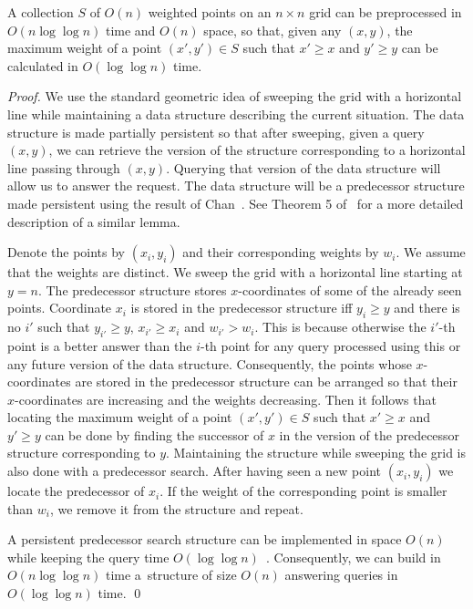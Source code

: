 \documentclass{llncs}
\begin{document}
\begin{lemma}
\label{lem:dominancemaximum}
A collection $S$ of $O(n)$ weighted points on an $n\times n$ grid can be preprocessed in $O(n\log\log n)$ time and $O(n)$ space,
so that, given any $(x,y)$, the maximum weight of a point $(x',y')\in S$ such that $x'\geq x$ and $y'\geq y$ can be calculated in
$O(\log\log n)$ time.
\end{lemma}

\begin{proof}
We use the standard geometric idea of sweeping the grid with a horizontal line while maintaining a data structure describing the current
situation. The data structure is made partially persistent so that after sweeping, given a query $(x,y)$, we can retrieve the version
of the structure corresponding to a horizontal line passing through $(x,y)$. Querying that version of the data structure will allow us
to answer the request. The data structure will be a predecessor structure made persistent using the result of Chan~\cite{ChanPersistent}.
See Theorem 5 of~\cite{MosheSurvey} 
for a more detailed description of a similar lemma.

Denote the points by $(x_{i},y_{i})$ and their corresponding weights by $w_{i}$. We assume that the weights are distinct.
We sweep the grid with a horizontal line starting at $y=n$. The predecessor structure stores $x$-coordinates of some of the already
seen points. Coordinate $x_{i}$ is stored in the predecessor structure iff $y_{i}\geq y$ and there is no $i'$
such that $y_{i'}\geq y$, $x_{i'}\geq x_{i}$ and $w_{i'}>w_{i}$. This is because otherwise the $i'$-th point is a better answer
than the $i$-th point for any query processed using this or any future version of the data structure.
Consequently, the points whose $x$-coordinates are stored in the predecessor structure can be arranged so that
their $x$-coordinates are increasing and the weights decreasing. Then it follows that locating the maximum weight
of a point $(x',y')\in S$ such that $x' \geq x$ and $y' \geq y$ can be done by finding the successor of $x$ in the
version of the predecessor structure corresponding to $y$. Maintaining the structure while sweeping the grid
is also done with a predecessor search. After having seen a new point $(x_{i},y_{i})$ we locate the predecessor of $x_{i}$.
If the weight of the corresponding point is smaller than $w_{i}$, we remove it from the structure and repeat.

A persistent predecessor search structure can be implemented in space $O(n)$ while keeping the query
time $O(\log\log n)$~\cite{ChanPersistent}. Consequently, we can build in $O(n\log\log n)$ time a~structure of
size $O(n)$ answering queries in $O(\log\log n)$ time. \qed
\end{proof}
\end{document}
